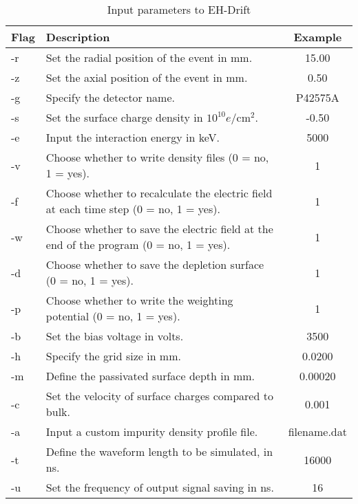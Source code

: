 \begin{table}[!htb]
    \centering
    \renewcommand{\arraystretch}{1.3} %
    \begin{tabular}{|l|p{10cm}|c|}
        \hline
        \textbf{Flag} & \textbf{Description} & \textbf{Example} \\ 
        \hline
        -r & Set the radial position of the event in mm. & 15.00 \\
        \hline
        -z & Set the axial position of the event in mm. & 0.50 \\
        \hline
        -g & Specify the detector name. & P42575A \\
        \hline
        -s & Set the surface charge density in $10^{10} e/\text{cm}^2$. & -0.50 \\
        \hline
        -e & Input the interaction energy in keV. & 5000 \\
        \hline
        -v & Choose whether to write density files (0 = no, 1 = yes). & 1 \\
        \hline
        -f & Choose whether to recalculate the electric field at each time step (0 = no, 1 = yes). & 1 \\
        \hline
        -w & Choose whether to save the electric field at the end of the program (0 = no, 1 = yes). & 1 \\
        \hline
        -d & Choose whether to save the depletion surface (0 = no, 1 = yes). & 1 \\
        \hline
        -p & Choose whether to write the weighting potential (0 = no, 1 = yes). & 1 \\
        \hline
        -b & Set the bias voltage in volts. & 3500 \\
        \hline
        -h & Specify the grid size in mm. & 0.0200 \\
        \hline
        -m & Define the passivated surface depth in mm. & 0.00020 \\
        \hline
        -c & Set the velocity of surface charges compared to bulk. & 0.001 \\
        \hline
        -a & Input a custom impurity density profile file. & filename.dat \\
        \hline
        -t & Define the waveform length to be simulated, in ns. & 16000 \\
        \hline
        -u & Set the frequency of output signal saving in ns. & 16 \\
        \hline
    \end{tabular}
    \caption{Input parameters to EH-Drift}
    \label{ch3_tab_ehdrift_parameters}
\end{table}
